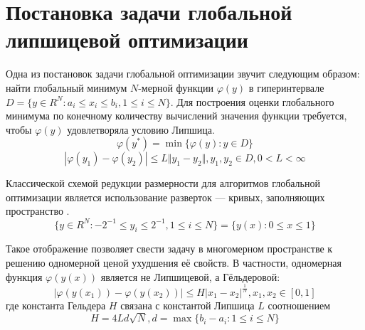 \section{Постановка задачи глобальной липшицевой оптимизации}
Одна из постановок задачи глобальной оптимизации звучит следующим образом: найти глобальный минимум \(N\)-мерной функции \(\varphi(y)\) в гиперинтервале \(D=\{y\in R^N:a_i\leqslant x_i\leqslant{b_i}, 1\leqslant{i}\leqslant{N}\}\).
Для построения оценки глобального минимума по конечному количеству вычислений значения функции требуется, чтобы \(\varphi(y)\) удовлетворяла условию Липшица.
\begin{displaymath}
\label{task}
\varphi(y^*)=\min\{\varphi(y):y\in D\}
\end{displaymath}
\begin{displaymath}
\label{lip}
|\varphi(y_1)-\varphi(y_2)|\leqslant L\Vert y_1-y_2\Vert,y_1,y_2\in D,0<L<\infty
\end{displaymath}
\par
Классической схемой редукции размерности для алгоритмов глобальной оптимизации является использование разверток --- кривых, заполняющих пространство \cite{strOptBook}.
\begin{displaymath}
\label{cube}
\lbrace y\in R^N:-2^{-1}\leqslant y_i\leqslant 2^{-1},1\leqslant i\leqslant N\rbrace=\{y(x):0\leqslant x\leqslant 1\}
\end{displaymath}
\par
 Такое отображение позволяет свести задачу в многомерном пространстве к решению одномерной ценой ухудшения её свойств. В частности, одномерная функция \(\varphi(y(x))\) является не
 Липшицевой, а Гёльдеровой:
\begin{displaymath}
\label{holder}
|\varphi(y(x_1))-\varphi(y(x_2))|\leqslant H{|x_1-x_2|}^{\frac{1}{N}},x_1,x_2\in[0,1]
\end{displaymath}
где константа Гельдера \(H\) связана с константой Липшица \(L\) соотношением
\begin{displaymath}
H=4Ld\sqrt{N},d=\max\{b_i-a_i:1\leqslant i\leqslant N\}
\end{displaymath}
\par
